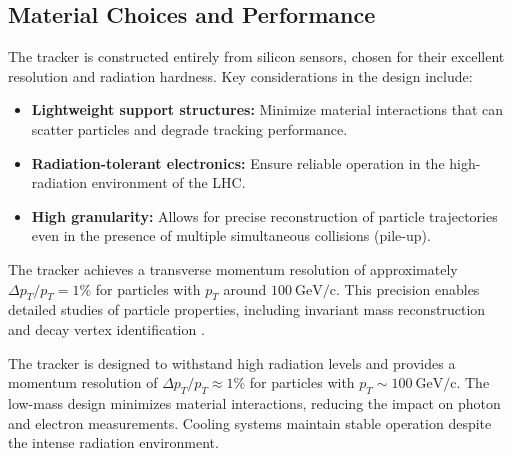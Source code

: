 \subsection{Material Choices and Performance}
The tracker is constructed entirely from silicon sensors, chosen for their excellent resolution and radiation hardness. Key considerations in the design include:
\begin{itemize}
    \item \textbf{Lightweight support structures:} Minimize material interactions that can scatter particles and degrade tracking performance.
    \item \textbf{Radiation-tolerant electronics:} Ensure reliable operation in the high-radiation environment of the LHC.
    \item \textbf{High granularity:} Allows for precise reconstruction of particle trajectories even in the presence of multiple simultaneous collisions (pile-up).
\end{itemize}

The tracker achieves a transverse momentum resolution of approximately $\Delta p_T / p_T = 1\%$ for particles with $p_T$ around $100~\mathrm{GeV/c}$. This precision enables detailed studies of particle properties, including invariant mass reconstruction and decay vertex identification \cite{tracker_tdr}.



The tracker is designed to withstand high radiation levels and provides a momentum resolution of $\Delta p_T / p_T \approx 1\%$ for particles with $p_T \sim 100~\mathrm{GeV/c}$. The low-mass design minimizes material interactions, reducing the impact on photon and electron measurements. Cooling systems maintain stable operation despite the intense radiation environment.

